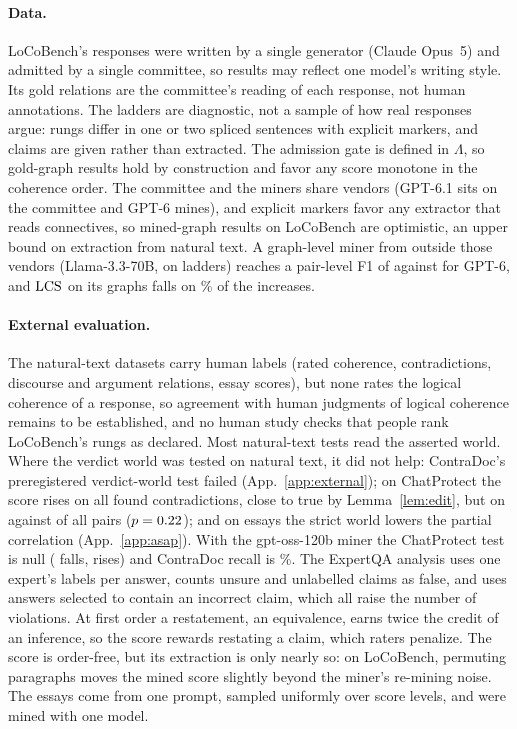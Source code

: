 \paragraph{Data.} LoCoBench's responses were written by a single generator (Claude Opus~5) and
admitted by a single committee, so results may reflect one model's writing style. Its gold relations
are the committee's reading of each response, not human annotations. The ladders are diagnostic, not
a sample of how real responses argue: rungs differ in one or two spliced sentences with explicit
markers, and claims are given rather than extracted. The admission gate is defined in $\Lambda$, so gold-graph results hold by construction and favor any
score monotone in the coherence order. The committee and the miners share vendors (GPT-6.1 sits on the
committee and GPT-6 mines), and
explicit markers favor any extractor that reads connectives, so mined-graph results on LoCoBench
are optimistic, an upper bound on extraction from natural text. A graph-level miner from outside
those vendors (Llama-3.3-70B, on \subLadders{} ladders) reaches a pair-level F1 of \subLlamaPairF{}
against \subGptPairF{} for GPT-6, and $\mathrm{LCS}$ on its graphs falls on \subLlamaLcsFalls\% of the
increases.

\paragraph{External evaluation.} The natural-text datasets carry human labels (rated coherence,
contradictions, discourse and argument relations, essay scores), but none rates the logical
coherence of a response, so agreement with human judgments of logical coherence remains to be
established, and no human study checks that people rank LoCoBench's rungs as declared. Most
natural-text tests read the asserted world. Where the verdict world was tested on natural text, it did not help: ContraDoc's preregistered
verdict-world test failed (App.~\ref{app:external}); on ChatProtect the score rises on all
\extCpVwFoundNGpt{} found contradictions, close to true by Lemma~\ref{lem:edit}, but on \extCpVwAllIncGpt{} against \extCpVwAllDecGpt{} of all
\extCpVwAllNGpt{} pairs ($p=0.22$); and on essays the strict world lowers the partial
correlation (App.~\ref{app:asap}). With the gpt-oss-120b miner the ChatProtect test is null
(\extCpAssertDecOss{} falls, \extCpAssertIncOss{} rises) and ContraDoc recall is \extCdRecallInsertOss\%. The ExpertQA analysis uses one expert's labels per answer, counts unsure and unlabelled claims as
false, and uses answers selected to contain an incorrect claim, which all raise the number of
violations.
At first order a restatement, an equivalence, earns twice the credit of an inference, so the score
rewards restating a claim, which raters penalize. The score is
order-free, but its extraction is only nearly so: on LoCoBench, permuting paragraphs moves the mined
score slightly beyond the miner's re-mining noise. The essays come from one prompt, sampled uniformly over score
levels, and were mined with one model.

